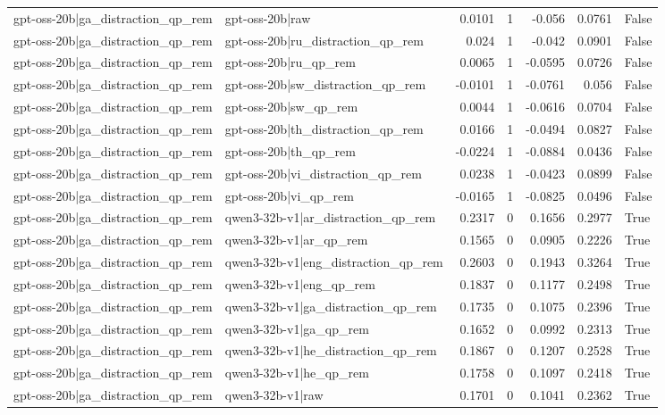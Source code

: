 \begin{table}
\begin{tabular}{l l r r r r l}
gpt-oss-20b|ga_distraction_qp_rem & gpt-oss-20b|raw & 0.0101 & 1 & -0.056 & 0.0761 & False \\
gpt-oss-20b|ga_distraction_qp_rem & gpt-oss-20b|ru_distraction_qp_rem & 0.024 & 1 & -0.042 & 0.0901 & False \\
gpt-oss-20b|ga_distraction_qp_rem & gpt-oss-20b|ru_qp_rem & 0.0065 & 1 & -0.0595 & 0.0726 & False \\
gpt-oss-20b|ga_distraction_qp_rem & gpt-oss-20b|sw_distraction_qp_rem & -0.0101 & 1 & -0.0761 & 0.056 & False \\
gpt-oss-20b|ga_distraction_qp_rem & gpt-oss-20b|sw_qp_rem & 0.0044 & 1 & -0.0616 & 0.0704 & False \\
gpt-oss-20b|ga_distraction_qp_rem & gpt-oss-20b|th_distraction_qp_rem & 0.0166 & 1 & -0.0494 & 0.0827 & False \\
gpt-oss-20b|ga_distraction_qp_rem & gpt-oss-20b|th_qp_rem & -0.0224 & 1 & -0.0884 & 0.0436 & False \\
gpt-oss-20b|ga_distraction_qp_rem & gpt-oss-20b|vi_distraction_qp_rem & 0.0238 & 1 & -0.0423 & 0.0899 & False \\
gpt-oss-20b|ga_distraction_qp_rem & gpt-oss-20b|vi_qp_rem & -0.0165 & 1 & -0.0825 & 0.0496 & False \\
gpt-oss-20b|ga_distraction_qp_rem & qwen3-32b-v1|ar_distraction_qp_rem & 0.2317 & 0 & 0.1656 & 0.2977 & True \\
gpt-oss-20b|ga_distraction_qp_rem & qwen3-32b-v1|ar_qp_rem & 0.1565 & 0 & 0.0905 & 0.2226 & True \\
gpt-oss-20b|ga_distraction_qp_rem & qwen3-32b-v1|eng_distraction_qp_rem & 0.2603 & 0 & 0.1943 & 0.3264 & True \\
gpt-oss-20b|ga_distraction_qp_rem & qwen3-32b-v1|eng_qp_rem & 0.1837 & 0 & 0.1177 & 0.2498 & True \\
gpt-oss-20b|ga_distraction_qp_rem & qwen3-32b-v1|ga_distraction_qp_rem & 0.1735 & 0 & 0.1075 & 0.2396 & True \\
gpt-oss-20b|ga_distraction_qp_rem & qwen3-32b-v1|ga_qp_rem & 0.1652 & 0 & 0.0992 & 0.2313 & True \\
gpt-oss-20b|ga_distraction_qp_rem & qwen3-32b-v1|he_distraction_qp_rem & 0.1867 & 0 & 0.1207 & 0.2528 & True \\
gpt-oss-20b|ga_distraction_qp_rem & qwen3-32b-v1|he_qp_rem & 0.1758 & 0 & 0.1097 & 0.2418 & True \\
gpt-oss-20b|ga_distraction_qp_rem & qwen3-32b-v1|raw & 0.1701 & 0 & 0.1041 & 0.2362 & True \\

\end{tabular}
\end{table}
